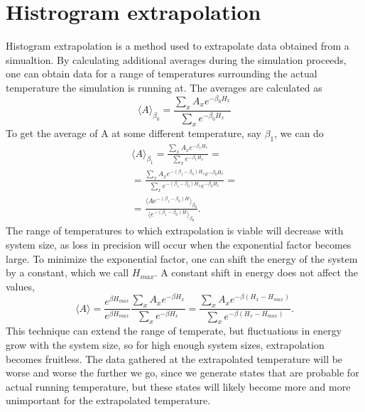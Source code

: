 \section{Histrogram extrapolation}
Histogram extrapolation is a method used to extrapolate data obtained from a simualtion.
By calculating additional averages during the simulation proceeds, one can obtain data for a range of temperatures surrounding the actual temperature the simulation is running at.
The averages are calculated as
\begin{equation}
  \langle A \rangle_{\beta_0} =  \frac{\sum_{x}A_x e^{-\beta_0 H_x}}{\sum_{x}e^{-\beta_0 H_x}}
\end{equation}
To get the average of A at some different temperature, say $\beta_1$, we can do
\begin{align}
  \langle A\rangle_{\beta_1} =  \frac{\sum_{x}A_x e^{-\beta_1 H_x}}{\sum_{x}e^{-\beta_1 H_x}} = \\
  = \frac{\sum_x A_x e^{-(\beta_1 - \beta_0)H_x} e^{-\beta_0 H_x}}{\sum_x e^{-(\beta_1 - \beta_0)H_x}e^{-\beta_0 H_x}} = \\
  = \frac{\langle A e^{-(\beta_1 - \beta_0)H}\rangle_{\beta_0}}{\langle e^{-(\beta_1 - \beta_0)H}\rangle_{\beta_0}}.
\end{align}
The range of temperatures to which extrapolation is viable will decrease with system size,
as loss in precision will occur when the exponential factor becomes large. To minimize the exponential factor, one can shift the energy of the system by a constant, which we call $H_{max}$. A constant shift in energy does not affect the values, 
\begin{equation}
  \langle A \rangle = \frac{e^{\beta H_{max}}}{e^{\beta H_{max}}}\frac{\sum_x A_x e^{-\beta H_x}}{\sum_x e^{-\beta H_x}}= \frac{\sum_x A_x e^{-\beta(H_x-H_{max})}}{\sum_x e^{-\beta(H_x-H_{max})}}.
  \label{}
\end{equation}
This technique can extend the range of temperate, but fluctuations in energy grow with the system size, so for high enough system sizes, extrapolation becomes fruitless.
The data gathered at the extrapolated temperature will be worse and worse the further we go, since we generate states that are probable for actual running temperature, but these states will likely become more and more unimportant for the extrapolated temperature.
